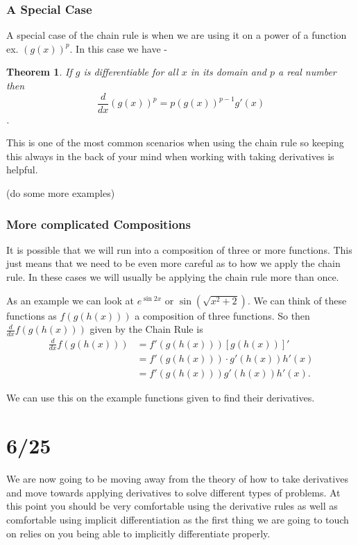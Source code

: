 \documentclass[12pt,reqno]{article}
\newtheorem{Theorem}{Theorem}
\theoremstyle{definition}
\begin{document}
\subsubsection{A Special Case}

A special case of the chain rule is when we are using it on a power of a function ex. $(g(x))^p$. In this case we have - 
\begin{Theorem}
	If $g$ is differentiable for all $x$ in its domain and $p$ a real number then $$\frac{d}{dx} (g(x))^{p} = p (g(x))^{p - 1} g'(x)$$. 
\end{Theorem}

This is one of the most common scenarios when using the chain rule so keeping this always in the back of your mind when working with taking derivatives is helpful. 

(do some more examples)

\subsubsection{More complicated Compositions} 

It is possible that we will run into a composition of three or more functions. This just means that we need to be even more careful as to how we apply the chain rule. In these cases we will usually be applying the chain rule more than once.

As an example we can look at $e^{\sin 2x}$ or $\sin (\sqrt{x^2 + 2})$. We can think of these functions as $f(g(h(x)))$ a composition of three functions. So then $\frac{d}{dx}f(g(h(x)))$ given by the Chain Rule is 
\begin{align*}
	\frac{d}{dx} f(g(h(x))) &= f'(g(h(x))) [g(h(x))]' \\
	&= f'(g(h(x))) \cdot g'(h(x)) h'(x) \\
	&= f'(g(h(x))) g'(h(x)) h'(x).
\end{align*}

We can use this on the example functions given to find their derivatives. 

\section{6/25} 

We are now going to be moving away from the theory of how to take derivatives and move towards applying derivatives to solve different types of problems. At this point you should be very comfortable using the derivative rules as well as comfortable using implicit differentiation as the first thing we are going to touch on relies on you being able to implicitly differentiate properly. 
\end{document}
